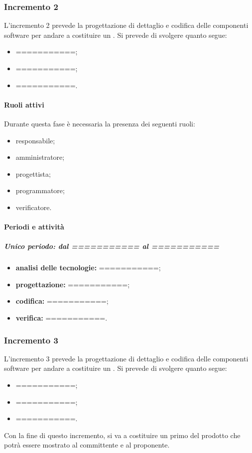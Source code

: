 
\subsubsection{Incremento 2}
L'incremento 2 prevede la progettazione di dettaglio e codifica delle componenti software per andare a costituire un . Si prevede di svolgere quanto segue:
\begin{itemize}
	\item ===========;
	\item ===========;
	\item ===========.
\end{itemize}

\paragraph{Ruoli attivi}
Durante questa fase è necessaria la presenza dei seguenti ruoli: 
\begin{itemize} 
	\item responsabile; 
	\item amministratore; 
	\item progettista; 
	\item programmatore; 
	\item verificatore.
\end{itemize}

\paragraph{Periodi e attività}
\subparagraph{Unico periodo: dal =========== al ===========}
\begin{itemize}
	\item \textbf{analisi delle tecnologie:} ===========;
	\item \textbf{progettazione:} ===========;
	\item \textbf{codifica:} ===========;
	\item \textbf{verifica:} ===========.
\end{itemize}


\subsubsection{Incremento 3}
L'incremento 3 prevede la progettazione di dettaglio e codifica delle componenti software per andare a costituire un . Si prevede di svolgere quanto segue:
\begin{itemize}
	\item ===========;
	\item ===========;
	\item ===========.
\end{itemize}
Con la fine di questo incremento, si va a costituire un primo  del prodotto che potrà essere mostrato al committente e al proponente.

